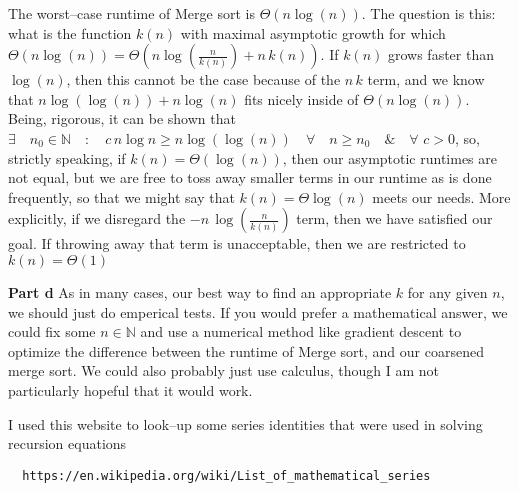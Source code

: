 \documentclass{article}
\begin{document}
    The worst--case runtime of Merge sort is $\Theta(n \log(n))$.
    The question is this: what is the function $k(n)$ with maximal asymptotic growth for which $\Theta(n \log(n)) = \Theta(n \log(\frac{n}{k(n)}) + n\,k(n))$.
    If $k(n)$ grows faster than $\log(n)$, then this cannot be the case because of the $n \, k$ term, and we know that $n \log(\log(n)) + n \log(n)$ fits nicely inside of $\Theta(n \log(n))$.
    Being, rigorous, it can be shown that $ \exists \quad n_0 \in \mathbb{N} \quad : \quad c\,n \log{n} \geq n \log(\log(n)) \quad \forall \quad n \geq n_0 \quad \& \quad \forall \,\,c > 0$, so, strictly speaking, if $k(n) = \Theta(\log(n))$, then our asymptotic runtimes are not equal, but we are free to toss away smaller terms in our runtime as is done frequently, so that we might say that $k(n) = \Theta{\log(n)}$ meets our needs.
    More explicitly, if we disregard the $-n \, \log(\frac{n}{k(n)})$ term, then we have satisfied our goal.
    If throwing away that term is unacceptable, then we are restricted to $k(n) = \Theta(1)$

  \textbf{Part d}
      As in many cases, our best way to find an appropriate $k$ for any given $n$, we should just do emperical tests.
      If you would prefer a mathematical answer, we could fix some $n \in \mathbb{N}$ and use a numerical method like gradient descent to optimize the difference between the runtime of Merge sort, and our coarsened merge sort.
      We could also probably just use calculus, though I am not particularly hopeful that it would work.


I used this website to look--up some series identities that were used in solving recursion equations
\begin{verbatim}
  https://en.wikipedia.org/wiki/List_of_mathematical_series
\end{verbatim}
\end{document}
